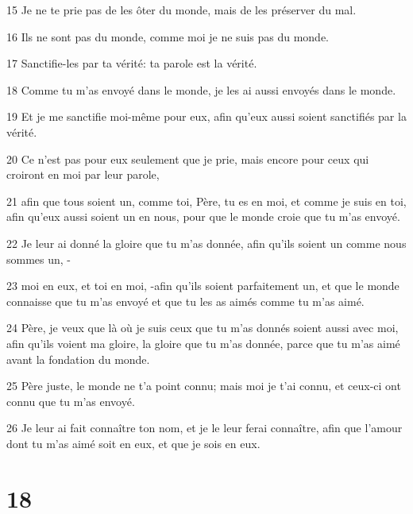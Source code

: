 \par 15 Je ne te prie pas de les ôter du monde, mais de les préserver du mal.
\par 16 Ils ne sont pas du monde, comme moi je ne suis pas du monde.
\par 17 Sanctifie-les par ta vérité: ta parole est la vérité.
\par 18 Comme tu m'as envoyé dans le monde, je les ai aussi envoyés dans le monde.
\par 19 Et je me sanctifie moi-même pour eux, afin qu'eux aussi soient sanctifiés par la vérité.
\par 20 Ce n'est pas pour eux seulement que je prie, mais encore pour ceux qui croiront en moi par leur parole,
\par 21 afin que tous soient un, comme toi, Père, tu es en moi, et comme je suis en toi, afin qu'eux aussi soient un en nous, pour que le monde croie que tu m'as envoyé.
\par 22 Je leur ai donné la gloire que tu m'as donnée, afin qu'ils soient un comme nous sommes un, -
\par 23 moi en eux, et toi en moi, -afin qu'ils soient parfaitement un, et que le monde connaisse que tu m'as envoyé et que tu les as aimés comme tu m'as aimé.
\par 24 Père, je veux que là où je suis ceux que tu m'as donnés soient aussi avec moi, afin qu'ils voient ma gloire, la gloire que tu m'as donnée, parce que tu m'as aimé avant la fondation du monde.
\par 25 Père juste, le monde ne t'a point connu; mais moi je t'ai connu, et ceux-ci ont connu que tu m'as envoyé.
\par 26 Je leur ai fait connaître ton nom, et je le leur ferai connaître, afin que l'amour dont tu m'as aimé soit en eux, et que je sois en eux.

\chapter{18}

